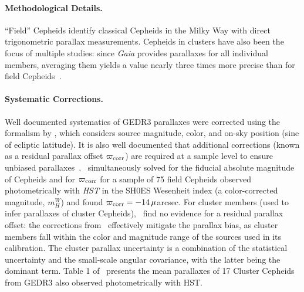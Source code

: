 \paragraph{Methodological Details.}
``Field'' Cepheids identify classical Cepheids in the Milky Way with direct trigonometric parallax measurements. Cepheids in clusters have also been the focus of multiple studies: since {\it Gaia} provides parallaxes for all individual members, averaging them yields a value nearly three times more precise than for field Cepheids~\citep{2020A&A...643A.115B, 2022ApJ...938...36R, 2023A&A...672A..85C, 2024AJ....168...34W}. 

\paragraph{Systematic Corrections.}
Well documented systematics of GEDR3 parallaxes were corrected using the formalism by \citet[L21]{2021A&A...649A...4L}, which considers source magnitude, color, and on-sky position (sine of ecliptic latitude). It is also well documented that additional corrections (known as a residual parallax offset $\varpi_{\rm corr}$) are required at a sample level to ensure unbiased parallaxes~\citep[e.g.,][]{2023A&A...680A.105K,2022AJ....163..149W,2021ApJ...909..200B}.~\citet{2021ApJ...908L...6R} simultaneously solved for the fiducial absolute magnitude of Cepheids and for $\varpi_{\rm corr}$ for a sample of 75 field Cepheids observed photometrically with {\it HST} in the SH0ES Wesenheit index (a color-corrected magnitude, $m_H^W$) and found $\varpi_{\rm corr}=-14\,\mu$arcsec. For cluster members (used to infer parallaxes of cluster Cepheids),~\citet[R22]{2022ApJ...934L...7R} find no evidence for a residual parallax offset: the corrections from~\citet{2021A&A...649A...4L} effectively mitigate the parallax bias, as cluster members fall within the color and magnitude range of the sources used in its calibration.  The cluster parallax uncertainty is a combination of the statistical uncertainty and the small-scale angular covariance, with the latter being the dominant term. Table 1 of~\citet{2022ApJ...938...36R} presents the mean parallaxes of 17 Cluster Cepheids from GEDR3 also observed photometrically with HST.

